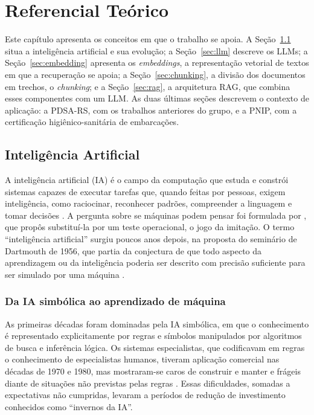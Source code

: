 \chapter{Referencial Teórico}
\label{cap:referencial}

Este capítulo apresenta os conceitos em que o trabalho se apoia. A Seção~\ref{sec:ia} situa a inteligência artificial e sua evolução; a Seção~\ref{sec:llm} descreve os LLMs; a Seção~\ref{sec:embedding} apresenta os \textit{embeddings}, a representação vetorial de textos em que a recuperação se apoia; a Seção~\ref{sec:chunking}, a divisão dos documentos em trechos, o \textit{chunking}; e a Seção~\ref{sec:rag}, a arquitetura RAG, que combina esses componentes com um LLM. As duas últimas seções descrevem o contexto de aplicação: a PDSA-RS, com os trabalhos anteriores do grupo, e a PNIP, com a certificação higiênico-sanitária de embarcações.

\section{Inteligência Artificial}
\label{sec:ia}

A inteligência artificial (IA) é o campo da computação que estuda e constrói sistemas capazes de executar tarefas que, quando feitas por pessoas, exigem inteligência, como raciocinar, reconhecer padrões, compreender a linguagem e tomar decisões \cite{Russell2020}. A pergunta sobre se máquinas podem pensar foi formulada por , que propôs substituí-la por um teste operacional, o jogo da imitação. O termo ``inteligência artificial'' surgiu poucos anos depois, na proposta do seminário de Dartmouth de 1956, que partia da conjectura de que todo aspecto da aprendizagem ou da inteligência poderia ser descrito com precisão suficiente para ser simulado por uma máquina \cite{McCarthy2006}.

\subsection{Da IA simbólica ao aprendizado de máquina}

As primeiras décadas foram dominadas pela IA simbólica, em que o conhecimento é representado explicitamente por regras e símbolos manipulados por algoritmos de busca e inferência lógica. Os sistemas especialistas, que codificavam em regras o conhecimento de especialistas humanos, tiveram aplicação comercial nas décadas de 1970 e 1980, mas mostraram-se caros de construir e manter e frágeis diante de situações não previstas pelas regras \cite{Russell2020}. Essas dificuldades, somadas a expectativas não cumpridas, levaram a períodos de redução de investimento conhecidos como ``invernos da IA''.

